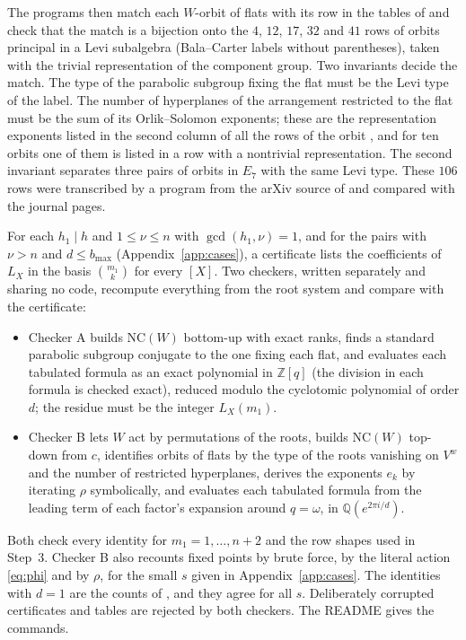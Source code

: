 \documentclass[11pt]{article}
\theoremstyle{definition}
\newcommand{\NC}{\mathrm{NC}}
\newcommand{\Z}{\mathbb{Z}}
\begin{document}
The programs then match each $W$-orbit of flats with its row in the tables
of \cite[\S3.6]{RS} and check that the match is a bijection onto the $4$,
$12$, $17$, $32$ and $41$ rows of orbits principal in a Levi subalgebra
(Bala--Carter labels without parentheses), taken with the trivial
representation of the component group. Two invariants decide the match.
The type of the parabolic subgroup fixing the flat must be the Levi type of
the label. The number of hyperplanes of the arrangement restricted to the
flat must be the sum of its Orlik--Solomon exponents; these are the
representation exponents listed in the second column of all the rows of
the orbit \cite[\S2 after (2.2), and \S3.6]{RS}, and for ten orbits one of
them is listed in a row with a nontrivial representation. The second
invariant separates three pairs of orbits in $E_7$ with the same Levi type.
These $106$ rows were transcribed by a program from the arXiv source of
\cite{RS} and compared with the journal pages.

For each $h_1\mid h$ and $1\le \nu\le n$ with $\gcd(h_1,\nu)=1$, and for the
pairs with $\nu>n$ and $d\le b_{\max}$ (Appendix~\ref{app:cases}), a
certificate lists the coefficients of $L_X$ in the basis $\binom{m_1}{k}$ for
every $[X]$. Two checkers, written separately and sharing no code,
recompute everything from the root system and compare with the
certificate:
\begin{itemize}
\item Checker A builds $\NC(W)$ bottom-up with exact ranks, finds a standard
parabolic subgroup conjugate to the one fixing each flat, and evaluates
each tabulated formula as an exact polynomial in $\Z[q]$ (the division in
each formula is checked exact), reduced modulo the cyclotomic polynomial of
order $d$; the residue must be the integer $L_X(m_1)$.
\item Checker B lets $W$ act by permutations of the roots, builds
$\NC(W)$ top-down from $c$, identifies orbits of flats by the type of the
roots vanishing on $V^w$ and the number of restricted hyperplanes, derives
the exponents $e_k$ by iterating $\rho$ symbolically, and evaluates each
tabulated formula from the leading term of each factor's expansion around
$q=\omega$, in $\mathbb Q(e^{2\pi i/d})$.
\end{itemize}
Both check every identity for $m_1=1,\dots,n+2$ and the row shapes used in
Step~3. Checker B also recounts fixed points by brute force, by the literal
action \eqref{eq:phi} and by $\rho$, for the small $s$ given in
Appendix~\ref{app:cases}. The identities with $d=1$ are the counts of
\cite[Theorem~3.10]{DJV}, and they agree for all $s$. Deliberately
corrupted certificates and tables are rejected by both checkers. The README
gives the commands.
\end{document}
